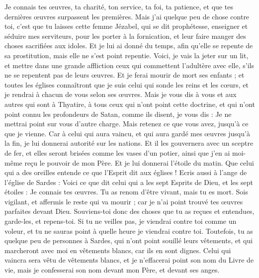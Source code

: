 \begin{multicols}{2}
Je connais tes œuvres, ta charité, ton service, ta foi, ta patience, et que tes dernières œuvres surpassent les premières.
Mais j'ai quelque peu de chose contre toi, c'est que tu laisses cette femme Jézabel, qui se dit prophétesse, enseigner et séduire mes serviteurs, pour les porter à la fornication, et leur faire manger des choses sacrifiées aux idoles.
Et je lui ai donné du temps, afin qu'elle se repente de sa prostitution, mais elle ne s'est point repentie.
Voici, je vais la jeter sur un lit, et mettre dans une grande affliction ceux qui commettent l'adultère avec elle, s'ils ne se repentent pas de leurs œuvres.
Et je ferai mourir de mort ses enfants ; et toutes les églises connaîtront que je suis celui qui sonde les reins et les cœurs, et je rendrai à chacun de vous selon ses œuvres.
Mais je vous dis à vous et aux autres qui sont à Thyatire, à tous ceux qui n'ont point cette doctrine, et qui n'ont point connu les profondeurs de Satan, comme ils disent, je vous dis : Je ne mettrai point sur vous d'autre charge.
Mais retenez ce que vous avez, jusqu'à ce que je vienne.
Car à celui qui aura vaincu, et qui aura gardé mes œuvres jusqu'à la fin, je lui donnerai autorité sur les nations.
Et il les gouvernera avec un sceptre de fer, et elles seront brisées comme les vases d'un potier, ainsi que j'en ai moi-même reçu le pouvoir de mon Père.
Et je lui donnerai l'étoile du matin.
Que celui qui a des oreilles entende ce que l'Esprit dit aux églises !
\VerseOne{}Ecris aussi à l'ange de l'église de Sardes : Voici ce que dit celui qui a les sept Esprits de Dieu, et les sept étoiles : Je connais tes œuvres. Tu as renom d'être vivant, mais tu es mort.
Sois vigilant, et affermis le reste qui va mourir ; car je n'ai point trouvé tes œuvres parfaites devant Dieu.
Souviens-toi donc des choses que tu as reçues et entendues, garde-les, et repens-toi. Si tu ne veilles pas, je viendrai contre toi comme un voleur, et tu ne sauras point à quelle heure je viendrai contre toi.
Toutefois, tu as quelque peu de personnes à Sardes, qui n'ont point souillé leurs vêtements, et qui marcheront avec moi en vêtements blancs, car ils en sont dignes.
Celui qui vaincra sera vêtu de vêtements blancs, et je n'effacerai point son nom du Livre de vie, mais je confesserai son nom devant mon Père, et devant ses anges.

\end{multicols}
